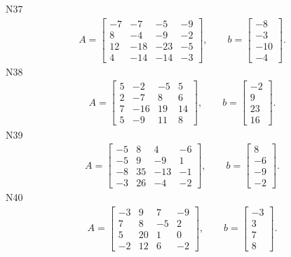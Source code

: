 \documentclass[11pt]{report}
\begin{document}
N37
\begin{align*}
 A = \left[\begin{matrix}-7 & -7 & -5 & -9\\8 & -4 & -9 & -2\\12 & -18 & -23 & -5\\4 & -14 & -14 & -3\end{matrix}\right],
\qquad b = \left[\begin{matrix}-8\\-3\\-10\\-4\end{matrix}\right]. 
 \end{align*}
N38
\begin{align*}
 A = \left[\begin{matrix}5 & -2 & -5 & 5\\2 & -7 & 8 & 6\\7 & -16 & 19 & 14\\5 & -9 & 11 & 8\end{matrix}\right],
\qquad b = \left[\begin{matrix}-2\\9\\23\\16\end{matrix}\right]. 
 \end{align*}
N39
\begin{align*}
 A = \left[\begin{matrix}-5 & 8 & 4 & -6\\-5 & 9 & -9 & 1\\-8 & 35 & -13 & -1\\-3 & 26 & -4 & -2\end{matrix}\right],
\qquad b = \left[\begin{matrix}8\\-6\\-9\\-2\end{matrix}\right]. 
 \end{align*}
N40
\begin{align*}
 A = \left[\begin{matrix}-3 & 9 & 7 & -9\\7 & 8 & -5 & 2\\5 & 20 & 1 & 0\\-2 & 12 & 6 & -2\end{matrix}\right],
\qquad b = \left[\begin{matrix}-3\\3\\7\\8\end{matrix}\right]. 
 \end{align*}
\end{document}
